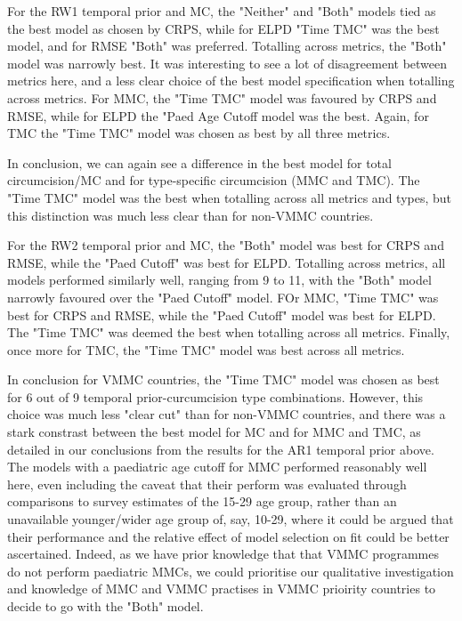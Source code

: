 \documentclass{article}
\begin{document}
For the RW1 temporal prior and MC, the "Neither" and "Both" models tied as the best model as chosen by CRPS, while for ELPD "Time TMC" was the best model, and for RMSE "Both" was preferred. 
Totalling across metrics, the "Both" model was narrowly best. 
It was interesting to see a lot of disagreement between metrics here, and a less clear choice of the best model specification when totalling across metrics. 
For MMC, the "Time TMC" model was favoured by CRPS and RMSE, while for ELPD the "Paed Age Cutoff model was the best. 
Again, for TMC the "Time TMC" model was chosen as best by all three metrics.

In conclusion, we can again see a difference in the best model for total circumcision/MC and for type-specific circumcision (MMC and TMC). 
The "Time TMC" model was the best when totalling across all metrics and types, but this distinction was much less clear than for non-VMMC countries. 

For the RW2 temporal prior and MC, the "Both" model was best for CRPS and RMSE, while the "Paed Cutoff" was best for ELPD.
Totalling across metrics, all models performed similarly well, ranging from 9 to 11, with the "Both" model narrowly favoured over the "Paed Cutoff" model. 
FOr MMC, "Time TMC" was best for CRPS and RMSE, while the "Paed Cutoff" model was best for ELPD. 
The "Time TMC" was deemed the best when totalling across all metrics. 
Finally, once more for TMC, the "Time TMC" model was best across all metrics. 

In conclusion for VMMC countries, the "Time TMC" model was chosen as best for 6 out of  9 temporal prior-curcumcision type combinations. 
However, this choice was much less "clear cut" than for non-VMMC countries, and there was a stark constrast between the best model for MC and for MMC and TMC, as detailed in our conclusions from the results for the AR1 temporal prior above. 
The models with a paediatric age cutoff for MMC performed reasonably well here, even including the caveat that their perform was evaluated through comparisons to survey estimates of the 15-29 age group, rather than an unavailable younger/wider age group of, say, 10-29, where it could be argued that their performance and the relative effect of model selection on fit could be better ascertained. 
Indeed, as we have prior knowledge that that VMMC programmes do not perform paediatric MMCs, we could prioritise our qualitative investigation and knowledge of MMC and VMMC practises in VMMC prioirity countries to decide 
to go with the "Both" model. 
\end{document}
